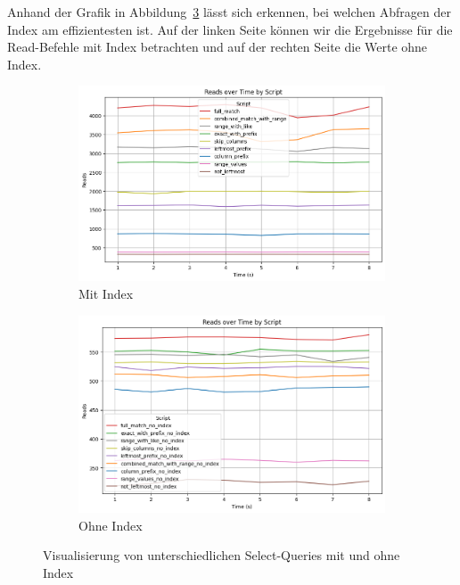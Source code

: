 Anhand der Grafik in Abbildung~\ref{fig:indexing-b-tree-query-reads} lässt sich erkennen, bei welchen Abfragen der Index am effizientesten ist.
Auf der linken Seite können wir die Ergebnisse für die Read-Befehle mit Index betrachten und auf der rechten Seite die Werte ohne Index.

\vspace{-5pt}
\begin{figure}[H]
    \centering
    \begin{subfigure}[t]{0.48\textwidth}
        \centering
        \includegraphics[width=\textwidth]{PNGs/Script/Index/B_Tree/b-tree-query-differences/Reads}
        \caption{Mit Index}
        \label{indexing-b-tree-query-reads-index}
    \end{subfigure}
    \hfill
    \begin{subfigure}[t]{0.48\textwidth}
        \centering
        \includegraphics[width=\textwidth]{PNGs/Script/Index/B_Tree/b-tree-query-differences-no-index/Reads}
        \caption{Ohne Index}
        \label{indexing-b-tree-query-reads-no-index}
    \end{subfigure}
    \vspace{-5pt}
    \caption[B-Tree-Indexing: Unterschiedliche Selects mit Index und Ohne]{Visualisierung von unterschiedlichen Select-Queries mit und ohne Index}
    \label{fig:indexing-b-tree-query-reads}
\end{figure}
\vspace{-15pt}

